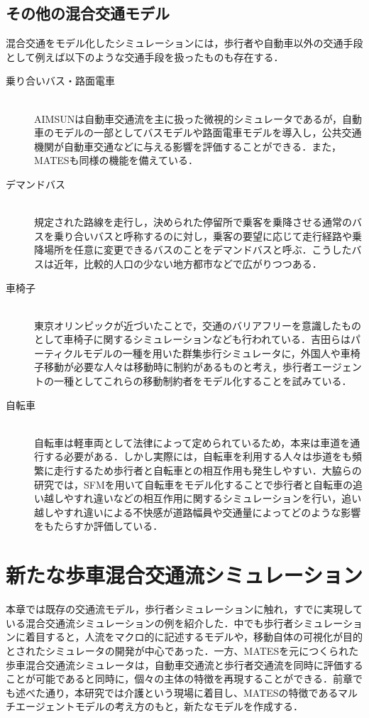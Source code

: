 \subsection{その他の混合交通モデル}

混合交通をモデル化したシミュレーションには，歩行者や自動車以外の交通手段として例えば以下のような交通手段を扱ったものも存在する．

\begin{description}
  \item[乗り合いバス・路面電車]\mbox{}\\
  AIMSUN\cite{dynamic_simulation}は自動車交通流を主に扱った微視的シミュレータであるが，自動車のモデルの一部としてバスモデルや路面電車モデルを導入し，公共交通機関が自動車交通などに与える影響を評価することができる．また，MATESも同様の機能を備えている．
  \item[デマンドバス]\mbox{}\\
  規定された路線を走行し，決められた停留所で乗客を乗降させる通常のバスを乗り合いバスと呼称するのに対し，乗客の要望に応じて走行経路や乗降場所を任意に変更できるバスのことをデマンドバスと呼ぶ．こうしたバスは近年，比較的人口の少ない地方都市などで広がりつつある．
  \item[車椅子]\mbox{}\\
  東京オリンピックが近づいたことで，交通のバリアフリーを意識したものとして車椅子に関するシミュレーションなども行われている．吉田らはパーティクルモデルの一種を用いた群集歩行シミュレータに，外国人や車椅子移動が必要な人々は移動時に制約があるものと考え，歩行者エージェントの一種としてこれらの移動制約者をモデル化することを試みている\cite{escape_simulation}．
  \item[自転車]\mbox{}\\
  自転車は軽車両として法律によって定められているため，本来は車道を通行する必要がある．しかし実際には，自転車を利用する人々は歩道をも頻繁に走行するため歩行者と自転車との相互作用も発生しやすい．大脇らの研究では，SFMを用いて自転車をモデル化することで歩行者と自転車の追い越しやすれ違いなどの相互作用に関するシミュレーションを行い，追い越しやすれ違いによる不快感が道路幅員や交通量によってどのような影響をもたらすか評価している\cite{necessity}．
\end{description}

\section{新たな歩車混合交通流シミュレーション}

本章では既存の交通流モデル，歩行者シミュレーションに触れ，すでに実現している混合交通流シミュレーションの例を紹介した．中でも歩行者シミュレーションに着目すると，人流をマクロ的に記述するモデルや，移動自体の可視化が目的とされたシミュレータの開発が中心であった．一方、MATESを元につくられた歩車混合交通流シミュレータは，自動車交通流と歩行者交通流を同時に評価することが可能であると同時に，個々の主体の特徴を再現することができる．前章でも述べた通り，本研究では介護という現場に着目し、MATESの特徴であるマルチエージェントモデルの考え方のもと，新たなモデルを作成する．
